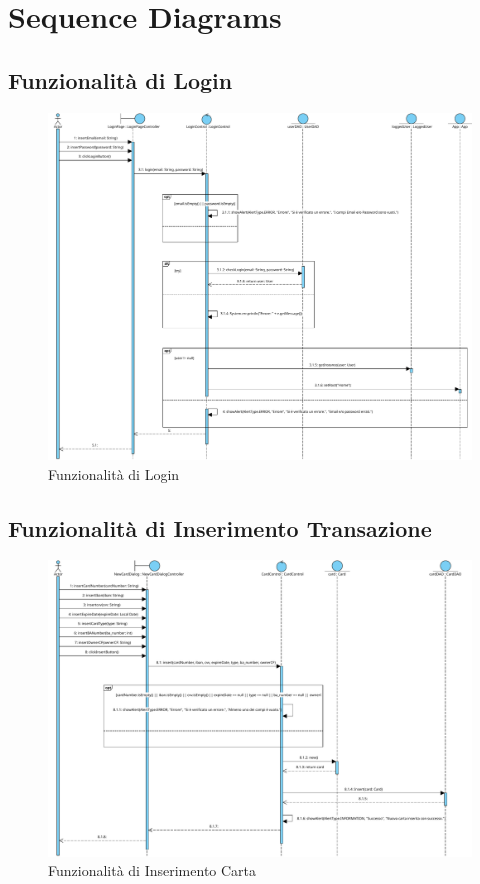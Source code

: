\chapter{Sequence Diagrams}

\section{Funzionalità di Login}

\begin{figure}[!h]
    \centering
    \includegraphics[scale=0.4]{pdfs/Login Sequence.pdf}
    \caption{Funzionalità di Login}
\end{figure}

\newpage

\section{Funzionalità di Inserimento Transazione}

\begin{figure}[!h]
    \centering
    \includegraphics[scale=0.4]{pdfs/New Card Sequence.pdf}
    \caption{Funzionalità di Inserimento Carta}
\end{figure}